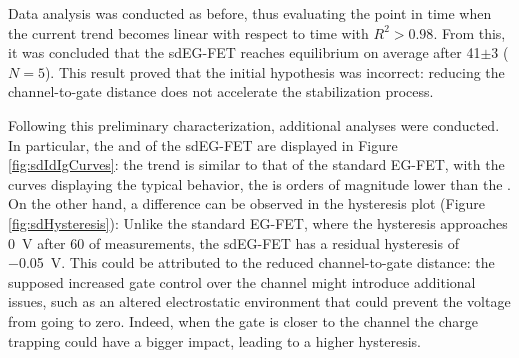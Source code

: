 Data analysis was conducted as before, thus evaluating the point in time when the current trend becomes linear with respect to time with $R^2>0.98$.
From this, it was concluded that the sdEG-FET reaches equilibrium on average after \SI{41}{}$\pm$\SI{3}{\min} ($N = 5$). This result proved that the initial hypothesis was incorrect: reducing the channel-to-gate distance does not accelerate the stabilization process.

\begin{figure}
    \centering
    \hfill
    \caption{}
    \label{fig:sdParameters}
\end{figure}

Following this preliminary characterization, additional analyses were conducted. In particular, the \ids{} and \igs{} of the sdEG-FET are displayed in Figure \ref{fig:sdIdIgCurves}: the trend is similar to that of the standard EG-FET, with the curves displaying the typical behavior, \ie{} the \igs{} is orders of magnitude lower than the \ids{}. On the other hand, a difference can be observed in the hysteresis plot (Figure \ref{fig:sdHysteresis}): Unlike the standard EG-FET, where the hysteresis approaches \SI{0}{\V} after \SI{60}{\min} of measurements, the sdEG-FET has a residual hysteresis of \SI{-0.05}{\V}.  This could be attributed to the reduced channel-to-gate distance: the supposed increased gate control over the channel might introduce additional issues, such as an altered electrostatic environment that could prevent the voltage from going to zero. Indeed, when the gate is closer to the channel the charge trapping could have a bigger impact, leading to a higher hysteresis.

